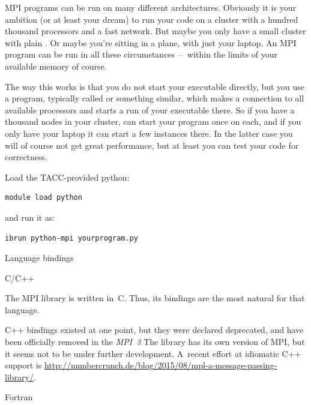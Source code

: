 MPI programs can be run on many different architectures. Obviously it
is your ambition (or at least your dream) to run your code on a
cluster with a hundred thousand processors and a fast network. But
maybe you only have a small cluster with
plain . Or maybe you're sitting in a plane, with
just your laptop. An MPI program can be run in all these
circumstances~--~within the limits of your available memory of course.

The way this works is that you do not start your executable directly,
but you use a program, typically called  or
something similar, which makes a connection to all available
processors and starts a run of your executable there. So if you have a
thousand nodes in your cluster,  can start your program once
on each, and if you only have your laptop it can start a few instances
there. In the latter case you will of course not get great
performance, but at least you can test your code for correctness.

\begin{tacc}
  \begin{pythonnote}
    Load the TACC-provided python:
\begin{verbatim}
module load python
\end{verbatim}
and run it as:
\begin{verbatim}
ibrun python-mpi yourprogram.py
\end{verbatim}
  \end{pythonnote}
\end{tacc}

 {Language bindings}

 {C/C++}

The MPI library is written in~C. Thus, its bindings are the most natural
for that language.

C++ bindings existed at one point, but they were declared deprecated,
and have been officially removed in the \emph{MPI~3}%
The  library has its own version of MPI, but it seems
not to be under further development.  A~recent
effort at idiomatic C++ support is 
\url{http://numbercrunch.de/blog/2015/08/mpl-a-message-passing-library/}.


 {Fortran}

